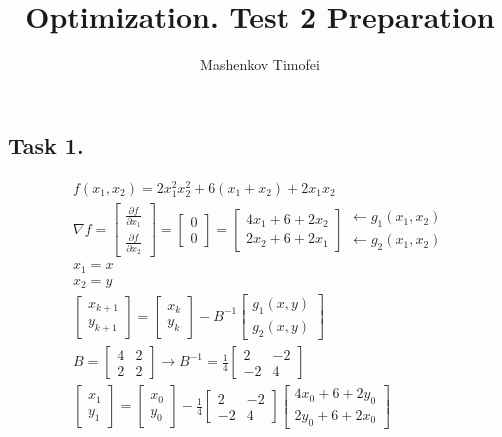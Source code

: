 \documentclass{article}
\title{Optimization. Test 2 Preparation}
\author{Mashenkov Timofei}
\begin{document}
\maketitle{}

\subsection*{Task 1.}

\addtolength{\jot}{2pt}
\begin{fleqn}[1\parindent]
  \begin{gather*}
    f(x_1,x_2) = 2x_1^2  x_2^2 + 6(x_1 + x_2) + 2x_1x_2 \\ 
    \nabla{f} = \begin{bmatrix}\frac{\partial f}{\partial x_1} \\ \frac{\partial f}{\partial x_2}\end{bmatrix} =
    \begin{bmatrix}0\\0\end{bmatrix} = \begin{bmatrix}4x_1+6+2x_2\\2x_2+6+2x_1\end{bmatrix} \begin{matrix}\leftarrow g_1(x_1,x_2)\\\leftarrow g_2(x_1,x_2)\end{matrix} \\
    x_1 = x \\ 
    x_2 = y \\ 
    \begin{bmatrix}x_{k+1} \\ y_{k+1}\end{bmatrix} = \begin{bmatrix}x_k \\
    y_k\end{bmatrix}-B^{-1}\begin{bmatrix}g_1(x,y) \\ g_2(x,y)\end{bmatrix} \\ 
    B = \begin{bmatrix}4 & 2 \\ 2 & 2\end{bmatrix} \rightarrow B^{-1} = \frac{1}{4} \begin{bmatrix}2 & -2 \\ -2 & 4\end{bmatrix} \\
    \begin{bmatrix}x_1\\y_1\end{bmatrix}=\begin{bmatrix}x_0\\y_0\end{bmatrix}-\frac{1}{4}\begin{bmatrix}2&-2\\-2&4\end{bmatrix}\begin{bmatrix}4x_0+6+2y_0\\2y_0+6+2x_0\end{bmatrix}
  \end{gather*}
\end{fleqn}
\end{document}
